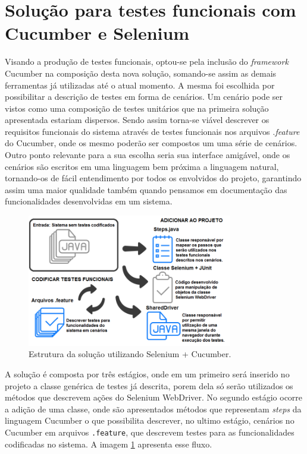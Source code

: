 \documentclass[tg]{mdtufsm}
\begin{document}
\section{Solução para testes funcionais com Cucumber e Selenium}
Visando a produção de testes funcionais, optou-se pela inclusão do \emph{framework} Cucumber na composição desta nova solução, somando-se assim as demais ferramentas já utilizadas até o atual momento. A mesma foi escolhida por possibilitar a descrição de testes em forma de cenários. Um cenário pode ser vistos como uma composição de testes unitários que na primeira solução apresentada estariam dispersos. Sendo assim torna-se viável descrever os requisitos funcionais do sistema através de testes funcionais nos arquivos \emph{.feature} do Cucumber, onde os mesmo poderão ser compostos um uma série de cenários. Outro ponto relevante para a sua escolha seria sua interface amigável, onde os cenários são escritos em uma linguagem bem próxima a linguagem natural, tornando-os de fácil entendimento por todos os envolvidos do projeto, garantindo assim uma maior qualidade também quando pensamos em documentação das funcionalidades desenvolvidas em um sistema.

\begin{figure}[!htb]
	\centering
	\includegraphics[width=0.8\textwidth]{solucao2}
	\caption{Estrutura da solução utilizando Selenium + Cucumber.}
	\label{fig:solucao2}
\end{figure}

A solução é composta por três estágios, onde em um primeiro será inserido no projeto a classe genérica de testes já descrita, porem dela só serão utilizados os métodos que descrevem ações do Selenium WebDriver. No segundo estágio ocorre a adição de uma classe, onde são apresentados métodos que representam \emph{steps} da linguagem Cucumber o que possibilita descrever, no ultimo estágio, cenários no Cucumber em arquivos \texttt{.feature}, que descrevem testes para as funcionalidades codificadas no sistema. A imagem \ref{fig:solucao2} apresenta esse fluxo.
\end{document}
